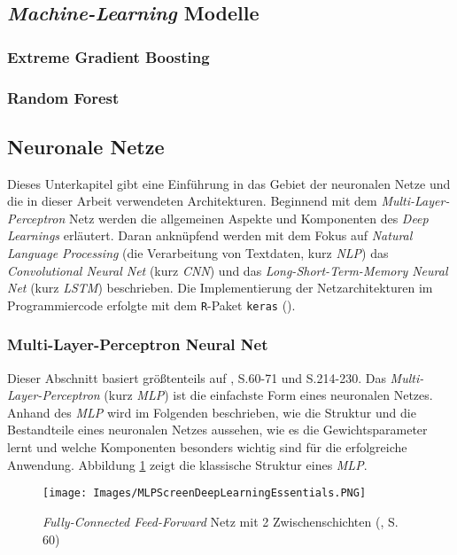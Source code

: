 \documentclass[a4paper,11pt]{article}
\begin{document}
\subsection{\textit{Machine-Learning} Modelle}\label{kap:machineLearning}

\subsubsection{Extreme Gradient Boosting}\label{kap:XG}
\subsubsection{Random Forest}\label{kap:RF}

\subsection{Neuronale Netze} \label{kap:neuralNets}

Dieses Unterkapitel gibt eine Einführung in das Gebiet der neuronalen Netze und die in dieser Arbeit verwendeten Architekturen. Beginnend mit dem \textit{Multi-Layer-Perceptron} Netz werden die allgemeinen Aspekte und Komponenten des \textit{Deep Learnings} erläutert. Daran anknüpfend werden mit dem Fokus auf \textit{Natural Language Processing} (die Verarbeitung von Textdaten, kurz \textit{NLP}) das \textit{Convolutional Neural Net} (kurz \textit{CNN}) und das \textit{Long-Short-Term-Memory Neural Net} (kurz \textit{LSTM}) beschrieben. Die Implementierung der Netzarchitekturen im Programmiercode erfolgte mit dem \texttt{R}-Paket \texttt{keras} (\cite{kerasR}).


\subsubsection{Multi-Layer-Perceptron Neural Net}

Dieser Abschnitt basiert größtenteils auf \cite{deepEssentials}, S.60-71 und S.214-230. %
Das \textit{Multi-Layer-Perceptron} (kurz \textit{MLP}) ist die einfachste Form eines neuronalen Netzes. Anhand des \textit{MLP} wird im Folgenden beschrieben, wie die Struktur und die Bestandteile eines neuronalen Netzes aussehen, wie es die Gewichtsparameter lernt und welche Komponenten besonders wichtig sind für die erfolgreiche Anwendung. Abbildung \ref{abb:MLPScreen} zeigt die klassische Struktur eines \textit{MLP}.


\begin{figure}[!ht]
\begin{center}
\texttt{[image: Images/MLPScreenDeepLearningEssentials.PNG]}
\caption{\textit{Fully-Connected Feed-Forward} Netz mit 2 Zwischenschichten (\cite{deepEssentials}, S. 60)}
\label{abb:MLPScreen}
\end{center}
\end{figure}
\end{document}
